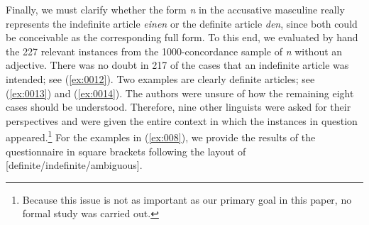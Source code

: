 Finally, we must clarify whether the form \textit{n} in the accusative masculine really represents the indefinite article \textit{einen} or the definite article \textit{den}, since both could be conceivable as the corresponding full form.
To this end, we evaluated by hand the 227 relevant instances from the 1000-concordance sample of \textit{n} without an adjective.
There was no doubt in 217 of the cases that an indefinite article was intended; see (\ref{ex:0012}).
Two examples are clearly definite articles; see (\ref{ex:0013}) and (\ref{ex:0014}).
The authors were unsure of how the remaining eight cases should be understood.
Therefore, nine other linguists were asked for their perspectives and were given the entire context in which the instances in question appeared.\footnote{
	Because this issue is not as important as our primary goal in this paper, no formal study was carried out.}
For the examples in (\ref{ex:008}), we provide the results of the questionnaire in square brackets following the layout of [definite/indefinite/ambiguous].

